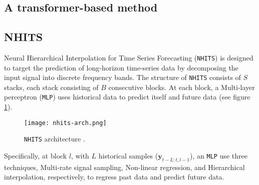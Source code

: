 
\subsection{A transformer-based method}


\subsection{NHITS}


Neural Hierarchical Interpolation for Time Series Forecasting (\verb|NHITS|) \cite{challu2023nhits} is designed to target the prediction of long-horizon time-series data by decomposing the input signal into discrete frequency bands. The structure of \verb|NHITS| consists of $S$ stacks, each stack consisting of $B$ consecutive blocks. At each block, a Multi-layer perceptron (\verb|MLP|) uses historical data to predict itself and future data (see figure \ref{fig:nhits}).

\begin{figure}[H]
    \centering
    \texttt{[image: nhits-arch.png]}
    \cprotect\caption{\verb|NHITS| architecture \cite{challu2023nhits}.}
    \label{fig:nhits}
\end{figure}


Specifically, at block $l$, with $L$ historical samples ($\mathbf{y}_{t-L:t, l-1}$), an \verb|MLP| use three techniques, Multi-rate signal sampling, Non-linear regression, and Hierarchical interpolation, respectively, to regress past data and predict future data.



